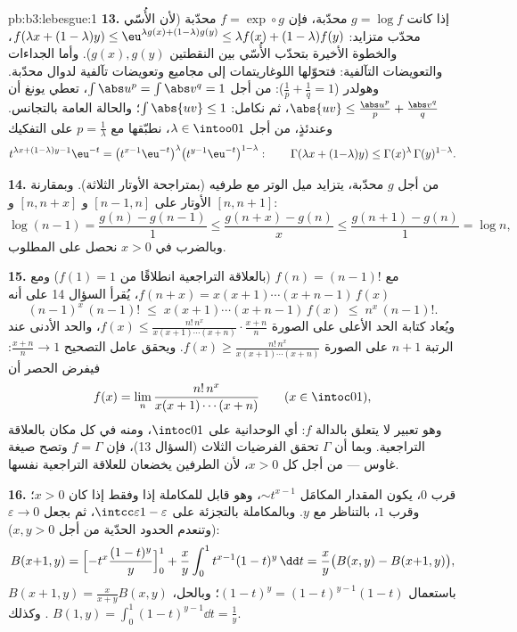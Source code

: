 \begin{solution}{pb:b3:lebesgue:1}
\textbf{13.} إذا كانت $g = \log f$ محدّبة، فإن $f = \exp\circ g$ محدّبة
(لأن الأُسّي محدّب متزايد: $f(\lambda x + (1-\lambda)
y) \leq \eu^{\lambda g(x) + (1-\lambda)g(y)} \leq \lambda f(x)
+ (1-\lambda)f(y)$، والخطوة الأخيرة بتحدّب
الأُسّي بين النقطتين $g(x), g(y)$). وأما الجداءات والتعويضات
التآلفية: فتحوّلها اللوغاريتمات إلى مجاميع وتعويضات تآلفية
لدوال محدّبة. وهولدر ($\frac1p + \frac1q = 1$): من أجل $\int\abs u^p = \int\abs v^q = 1$، تعطي يونغ أن
$\abs{uv} \leq
\frac{\abs u^p}p + \frac{\abs v^q}q$، ثم نكامل: $\int\abs{uv}
\leq 1$؛ والحالة العامة بالتجانس. وعندئذٍ،
من أجل $\lambda
\in \intoo01$، نطبّقها مع $p = \frac1\lambda$ على التفكيك
\[
t^{\lambda x + (1-\lambda)y - 1}\eu^{-t}
= \bigl(t^{x-1}\eu^{-t}\bigr)^{\lambda}
\bigl(t^{y-1}\eu^{-t}\bigr)^{1-\lambda} :
\qquad
\Gamma(\lambda x + (1{-}\lambda)y) \leq
\Gamma(x)^\lambda\,\Gamma(y)^{1-\lambda} .
\]

\textbf{14.} من أجل $g$ محدّبة، يتزايد ميل الوتر مع طرفيه
(بمتراجحة الأوتار الثلاثة). وبمقارنة الأوتار على $[n-1, n]$
و $[n, n+x]$ و $[n, n+1]$:
\[
\log(n-1) = \frac{g(n) - g(n-1)}1 \leq
\frac{g(n+x) - g(n)}x \leq \frac{g(n+1) - g(n)}1 = \log n,
\]
وبالضرب في $x > 0$ نحصل على المطلوب.

\textbf{15.} مع $f(n) = (n-1)!$ (بالعلاقة التراجعية انطلاقًا من
$f(1) = 1$) ومع $f(n + x) = x(x+1)\cdots(x+n-1)\,f(x)$، يُقرأ السؤال 14 على أنه
\[
(n-1)^x\,(n-1)! \;\leq\; x(x+1)\cdots(x+n-1)\,f(x)
\;\leq\; n^x\,(n-1)! .
\]
ويُعاد كتابة الحد الأعلى على الصورة $f(x) \leq
\frac{n!\,n^x}{x(x+1)\cdots(x+n)}\cdot\frac{x+n}n$، والحد الأدنى عند
الرتبة $n+1$ على الصورة $f(x) \geq
\frac{n!\,n^x}{x(x+1)\cdots(x+n)}$. ويحقق عامل التصحيح $\frac{x+n}n \to 1$:
فيفرض الحصر أن
\[
f(x) = \lim_n\frac{n!\,n^x}{x(x+1)\cdots(x+n)}
\qquad (x \in \intoc01),
\]
وهو تعبير لا يتعلق بالدالة $f$: أي الوحدانية على $\intoc01$، ومنه في
كل مكان بالعلاقة التراجعية. وبما أن $\Gamma$ تحقق الفرضيات
الثلاث (السؤال 13)، فإن $f = \Gamma$ وتصح صيغة غاوس --- من أجل
كل $x > 0$، لأن الطرفين يخضعان للعلاقة التراجعية نفسها.

\textbf{16.} قرب $0$، يكون المقدار المكامَل $\sim t^{x-1}$،
وهو قابل للمكاملة إذا وفقط إذا كان $x > 0$؛ وقرب $1$، بالتناظر
مع $y$. وبالمكاملة بالتجزئة على $\intcc\varepsilon{1-\varepsilon}$، ثم بجعل $\varepsilon \to 0$ (وتنعدم
الحدود الحدّية من أجل $x, y >
0$):
\[
B(x{+}1, y) = \Bigl[-t^x\frac{(1-t)^y}y\Bigr]_0^1 +
\frac xy\int_0^1t^{x-1}(1-t)^y\,\dd t
= \frac xy\bigl(B(x, y) - B(x{+}1, y)\bigr),
\]
باستعمال $(1-t)^y = (1-t)^{y-1}(1 - t)$؛ وبالحل، $B(x+1, y) =
\frac{x}{x+y}B(x, y)$. وكذلك $B(1, y) =
\int_0^1(1-t)^{y-1}\dd t = \frac1y$.


\end{solution}
